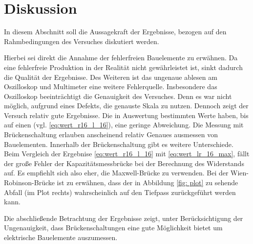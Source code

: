 \section{Diskussion}
In diesem Abschnitt soll die Aussagekraft der Ergebnisse, bezogen auf den %
Rahmbedingungen des Versuches diskutiert werden. %

Hierbei sei direkt die Annahme der fehlerfreien Bauelemente zu erwähnen.
Da eine fehlerfreie Produktion in der Realität nicht gewährleistet ist,
sinkt dadurch die Qualität der Ergebnisse. %
Des Weiteren ist das ungenaue ablesen am Oszilloskop und Multimeter eine %
weitere Fehlerquelle.
Insbesondere das Oszilloskop beeinträchtigt die Genauigkeit des Versuches.
Denn es war nicht möglich, aufgrund eines Defekts, die genauste
Skala zu nutzen. %
Dennoch zeigt der Versuch relativ gute Ergebnisse.
Die in Auswertung bestimmten Werte haben, bis auf einen (vgl. \eqref{eq:wert_r16_l_16}), eine geringe Abweichung. %
Die Messung mit Brückenschaltung erlauben anscheinend relativ Genaues ausmessen von Bauelementen. %
Innerhalb der Brückenschaltung gibt es weitere Unterschiede. %
Beim Vergleich der Ergebnise \eqref{eq:wert_r16_l_16} mit \eqref{eq:wert_lr_16_max}, %
fällt der große Fehler der Kapazitätsmessbrücke bei der Berechnung des Widerstands
auf. Es empfiehlt sich also eher, die Maxwell-Brücke zu verwenden. %
Bei der Wien-Robinson-Brücke ist zu erwähnen, dass der in Abbildung \ref{fig: plot}
zu sehende Abfall (im Plot rechts) wahrscheinlich auf den Tiefpass zurückgeführt werden
kann.

Die abschließende Betrachtung der Ergebnisse zeigt, unter Berücksichtigung der Ungenauigkeit,
dass Brückenschaltungen eine gute Möglichkeit bietet um elektrische Bauelemente %
auszumessen.
